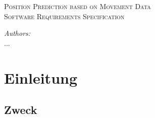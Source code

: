 \documentclass[12pt]{article} %
\begin{document}


\begin{titlepage}

\newcommand{\HRule}{\rule{\linewidth}{0.5mm}} %

\center %

\textsc{\Large Position Prediction based on Movement Data}\\[0.5cm] %
\textsc{\large Software Requirements Specification}\\[0.5cm] %

\vfill

\emph{Authors:}\\
...

\vfill %

\end{titlepage}


\tableofcontents %

\newpage %


\section{Einleitung}


\subsection{Zweck}


\end{document}

